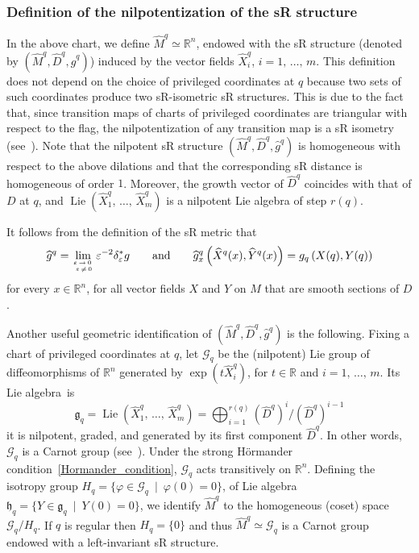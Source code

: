 \documentclass[10pt]{amsart}
\theoremstyle{definition}\newtheorem{defi}[theo]{Definition}\newtheorem{rema}[theo]{Remark}\newtheorem{exam}[theo]{Example}\newtheorem{exem}[theo]{Example}\newtheorem{nota}[theo]{Notation}
\newcommand*\R{\mathbb{R}}
\newcommand{\calG}{\mathcal{G}}
\newcommand{\frkg}{\mathfrak{g}}
\newcommand{\frkh}{\mathfrak{h}}
\DeclareMathOperator{\Lie}{Lie}
\begin{document}
\subsubsection{Definition of the nilpotentization of the sR structure}\label{sec_def_nilpotentization}
In the above chart, we define $\widehat{M}^{q}\simeq\R^n$, endowed with the sR structure (denoted by $(\widehat{M}^{q},\widehat{D}^{q},\widehat{g}^{q})$) induced by the vector fields $\widehat{X}^{q}_i$, $i=1,\,\ldots,\,m$. This definition does not depend on the choice of privileged coordinates at $q$ because two sets of such coordinates produce two sR-isometric sR structures. This is due to the fact that, since transition maps of charts of privileged coordinates are triangular with respect to the flag, the nilpotentization of any transition map is a sR isometry (see~\cite[Proposition~5.20]{Bellaiche}). Note that the nilpotent sR structure $(\widehat{M}^{q},\widehat{D}^{q},\widehat{g}^{q})$ is homogeneous with respect to the above dilations and that the corresponding sR distance is homogeneous of order $1$. Moreover, the growth vector of $\widehat{D}^{q}$ coincides with that of $D$ at $q$, and $\Lie(\widehat{X}^{q}_1,\,\ldots,\,\widehat{X}^{q}_m)$ is a nilpotent Lie algebra of step $r(q)$.

It follows from the definition of the sR metric that
\[
\widehat{g}^{q} = \lim_{\varepsilon\,\rightarrow\,0\,\atop \,\varepsilon\,\neq\,0} \varepsilon^{-2} \delta_\varepsilon^* g
\qquad \text{and}\qquad
\widehat{g}^{q}_x\left(\widehat{X}^{q}(x),\widehat{Y}^{q}(x)\right) = g_{q}\left(X(q),Y(q)\right)
\]
for every $x\in\R^n$, for all vector fields $X$ and $Y$ on $M$ that are smooth sections of $D$.

Another useful geometric identification of $(\widehat{M}^{q},\widehat{D}^{q},\widehat{g}^{q})$ is the following. Fixing a chart of privileged coordinates at $q$, let $\calG_{q}$ be the (nilpotent) Lie group of diffeomorphisms of $\R^n$ generated by $\exp(t\widehat{X}^{q}_i)$, for $t\in\R$ and $i=1,\,\ldots,\,m$. Its Lie algebra~is
\[
\frkg_{q} = \Lie\left(\widehat{X}^{q}_1,\,\ldots,\,\widehat{X}^{q}_m\right) = \bigoplus_{i=1}^{r(q)} \left(\widehat{D}^{q} \right)^i / \left(\widehat{D}^{q} \right)^{i-1}
\]
it is nilpotent, graded, and generated by its first component $\widehat{D}^{q}$. In other words, $\calG_{q}$ is a Carnot group (see~\cite{Mo-02}). Under the strong H\"ormander condition~\eqref{Hormander_condition}, $\calG_{q}$ acts transitively on $\R^n$. Defining the isotropy group $H_{q}=\{\varphi\in \calG_{q}\ \mid\ \varphi(0)=0\}$, of Lie algebra $\frkh_{q}=\{Y\in \frkg_{q}\ \mid\ Y(0)=0\}$, we identify $\widehat{M}^{q}$ to the homogeneous (coset) space $\calG_{q}/H_{q}$. If $q$ is regular then $H_{q}=\{0\}$ and thus $\widehat{M}^{q}\simeq \calG_{q}$ is a Carnot group endowed with a left-invariant sR structure.
\end{document}
